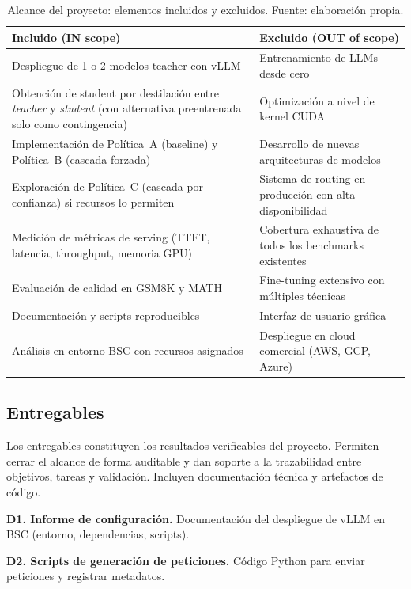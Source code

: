 \begin{table}[H]
\centering
\caption{Alcance del proyecto: elementos incluidos y excluidos. Fuente: elaboración propia.}
\label{tab:scope}
\small
\begin{tabular}{>{\raggedright\arraybackslash}p{6.5cm} >{\raggedright\arraybackslash}p{6.5cm}}
\toprule
\textbf{Incluido (IN scope)} & \textbf{Excluido (OUT of scope)} \\
\midrule
Despliegue de 1 o 2 modelos teacher con vLLM & Entrenamiento de LLMs desde cero \\
\addlinespace
Obtención de student por destilación entre \textit{teacher} y \textit{student} (con alternativa preentrenada solo como contingencia) & Optimización a nivel de kernel CUDA \\
\addlinespace
Implementación de Política~A (baseline) y Política~B (cascada forzada) & Desarrollo de nuevas arquitecturas de modelos \\
\addlinespace
Exploración de Política~C (cascada por confianza) si recursos lo permiten & Sistema de routing en producción con alta disponibilidad \\
\addlinespace
Medición de métricas de serving (TTFT, latencia, throughput, memoria GPU) & Cobertura exhaustiva de todos los benchmarks existentes \\
\addlinespace
Evaluación de calidad en GSM8K y MATH & Fine-tuning extensivo con múltiples técnicas \\
\addlinespace
Documentación y scripts reproducibles & Interfaz de usuario gráfica \\
\addlinespace
Análisis en entorno BSC con recursos asignados & Despliegue en cloud comercial (AWS, GCP, Azure) \\
\bottomrule
\end{tabular}
\end{table}

\subsection{Entregables}

Los entregables constituyen los resultados verificables del proyecto. Permiten cerrar el alcance de forma auditable y dan soporte a la trazabilidad entre objetivos, tareas y validación. Incluyen documentación técnica y artefactos de código.

\textbf{D1. Informe de configuración.} Documentación del despliegue de vLLM en BSC (entorno, dependencias, scripts).

\textbf{D2. Scripts de generación de peticiones.} Código Python para enviar peticiones y registrar metadatos.

